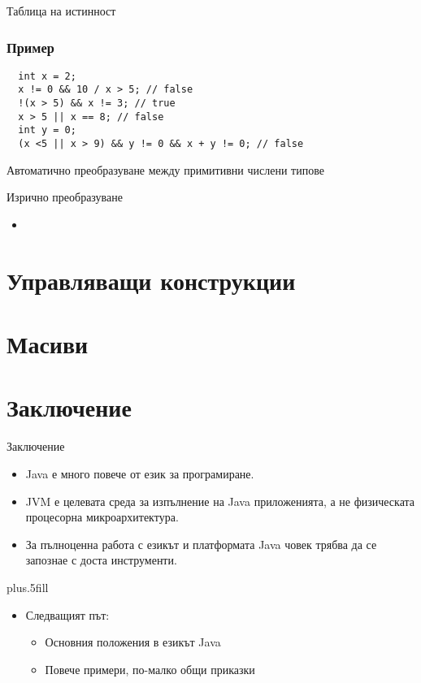 \documentclass{beamer}
\begin{document}
\begin{frame}{Таблица на истинност}
  
\end{frame}

\begin{frame}[fragile]
  \frametitle{Пример}
\begin{lstlisting}
  int x = 2;
  x != 0 && 10 / x > 5; // false
  !(x > 5) && x != 3; // true
  x > 5 || x == 8; // false
  int y = 0;
  (x <5 || x > 9) && y != 0 && x + y != 0; // false
\end{lstlisting}
\end{frame}


\begin{frame}{Автоматично преобразуване между примитивни числени типове}
  
\end{frame}


\begin{frame}{Изрично преобразуване}
  \begin{itemize}
  \item 
  \end{itemize}
\end{frame}


\section{Управляващи конструкции}

\section{Масиви}

\section*{Заключение}

\begin{frame}{Заключение}

  \begin{itemize}
  \item
    Java \alert{е много повече от език за програмиране}.
  \item
    JVM \alert{е целевата среда за изпълнение} на Java приложенията, а
    не физическата процесорна микроархитектура.
  \item
    За пълноценна работа с езикът и платформата Java човек трябва да
    се запознае с доста инструменти.
  \end{itemize}
  
  \vskip0pt plus.5fill
  \begin{itemize}
  \item
    Следващият път:
    \begin{itemize}
    \item
      Основния положения в езикът Java
    \item
      Повече примери, по-малко общи приказки
    \end{itemize}
  \end{itemize}
\end{frame}
\end{document}
